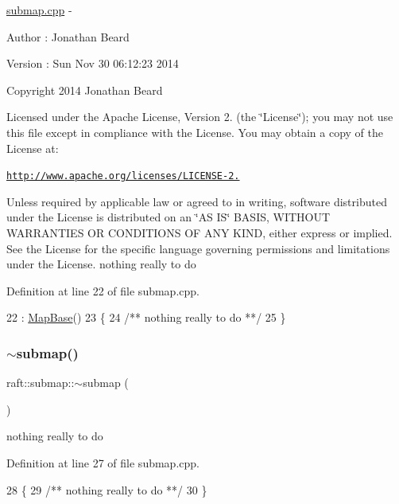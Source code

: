 \hyperlink{submap_8cpp_source}{submap.\+cpp} -\/ \begin{DoxyAuthor}{Author}
\+: Jonathan Beard 
\end{DoxyAuthor}
\begin{DoxyVersion}{Version}
\+: Sun Nov 30 06\+:12\+:23 2014
\end{DoxyVersion}
Copyright 2014 Jonathan Beard

Licensed under the Apache License, Version 2. (the \char`\"{}\+License\char`\"{}); you may not use this file except in compliance with the License. You may obtain a copy of the License at\+:

\href{http://www.apache.org/licenses/LICENSE-2.0}{\tt http\+://www.\+apache.\+org/licenses/\+L\+I\+C\+E\+N\+S\+E-\/2.}

Unless required by applicable law or agreed to in writing, software distributed under the License is distributed on an \char`\"{}\+A\+S I\+S\char`\"{} B\+A\+S\+IS, W\+I\+T\+H\+O\+UT W\+A\+R\+R\+A\+N\+T\+I\+ES OR C\+O\+N\+D\+I\+T\+I\+O\+NS OF A\+NY K\+I\+ND, either express or implied. See the License for the specific language governing permissions and limitations under the License. nothing really to do 

Definition at line 22 of file submap.\+cpp.


\begin{DoxyCode}
22                    : \hyperlink{class_map_base_a5a923d5b3ececb0407aa934d967ab7b1}{MapBase}()
23 \{\textcolor{comment}{}
24 \textcolor{comment}{   /** nothing really to do **/}
25 \}
\end{DoxyCode}
\hypertarget{classraft_1_1submap_a2a2553b8a5d59a0c7c7146cad9a035c9}{}\label{classraft_1_1submap_a2a2553b8a5d59a0c7c7146cad9a035c9} 
\subsubsection{\texorpdfstring{$\sim$submap()}{~submap()}}
{\footnotesize\ttfamily raft\+::submap\+::$\sim$submap (\begin{DoxyParamCaption}{ }\end{DoxyParamCaption})\hspace{0.3cm}{\ttfamily [virtual]}}

nothing really to do 

Definition at line 27 of file submap.\+cpp.


\begin{DoxyCode}
28 \{\textcolor{comment}{}
29 \textcolor{comment}{   /** nothing really to do **/}
30 \}
\end{DoxyCode}


